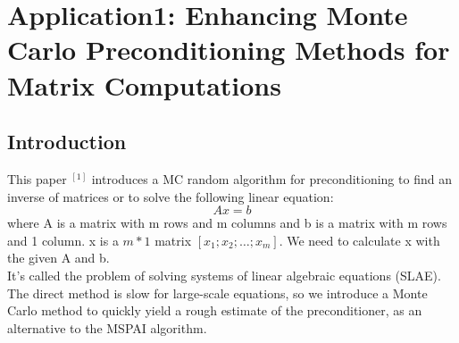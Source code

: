 \documentclass[10pt,journal]{IEEEtran}
\begin{document}
\section{Application1: Enhancing Monte Carlo Preconditioning Methods for Matrix Computations}
\subsection{Introduction}
This paper $^{[1]}$ introduces a MC random algorithm for preconditioning to find an inverse of matrices or to solve the following linear equation:
\[Ax=b\]
where A is a matrix with m rows and m columns and b is a matrix with m rows and 1 column. x is a $m * 1$ matrix $[x_1;x_2;\ldots;x_m]$. We need to calculate x with the given A and b.\\
It's called the problem of solving systems of linear algebraic equations (SLAE). The direct method is slow for large-scale equations, so we introduce a Monte Carlo method to quickly yield a rough estimate of the preconditioner, as an alternative to the MSPAI algorithm.
\end{document}
